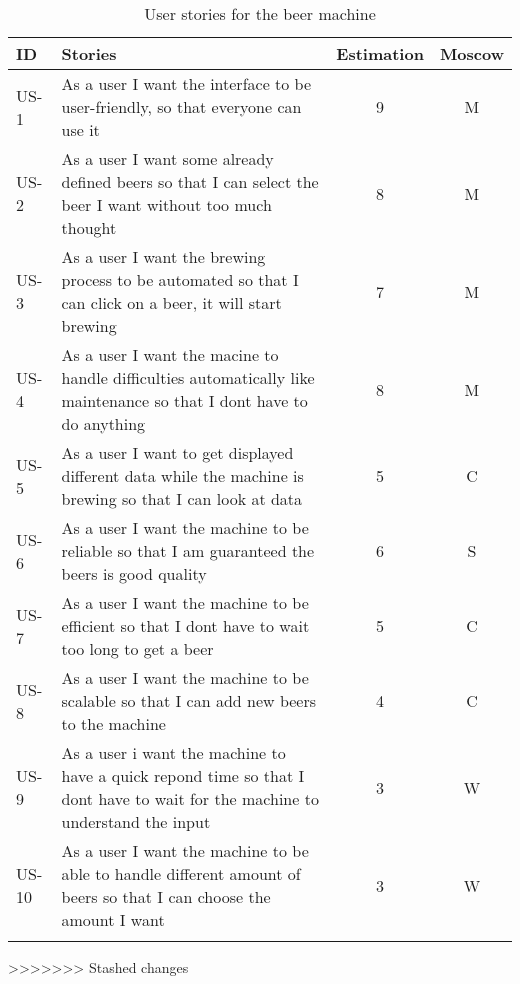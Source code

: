 \begin{table}[H]
    \begin{center}
        \sloppy
        \begin{longtable}{|p{1cm}|p{11cm}|c|c|}
            \hline
            ID & Stories & Estimation & Moscow \\ \hline
            US-1 & As a user I want the interface to be user-friendly, so that everyone can use it & 9 & M \\ \hline
            US-2 & As a user I want some already defined beers  so that I can select the beer I want without too much thought & 8 & M \\ \hline
            US-3 & As a user I want the brewing process to be automated so that I can click on a beer, it will start brewing & 7 & M \\ \hline
            US-4 & As a user I want the macine to handle difficulties automatically like maintenance so that I dont have to do anything & 8 & M \\ \hline
            US-5 & As a user I want to get displayed different data while the machine is brewing so that I can look at data & 5 & C \\ \hline
            US-6 & As a user I want the machine to be reliable so that I am guaranteed the beers is good quality & 6 & S \\ \hline
            US-7 & As a user I want the machine to be efficient so that I dont have to wait too long to get a beer & 5 & C \\ \hline
            US-8 & As a user I want the machine to be scalable so that I can add new beers to the machine & 4 & C \\ \hline
            US-9 & As a user i want the machine to have a quick repond time so that I dont have to wait for the machine to understand the input & 3 & W \\ \hline
            US-10 & As a user I want the machine to be able to handle different amount of beers so that I can choose the amount I want & 3 & W \\ \hline

            \caption{User stories for the beer machine}
            \label{tab:user_stories}
        \end{longtable}
    \end{center}
\end{table}
>>>>>>> Stashed changes
